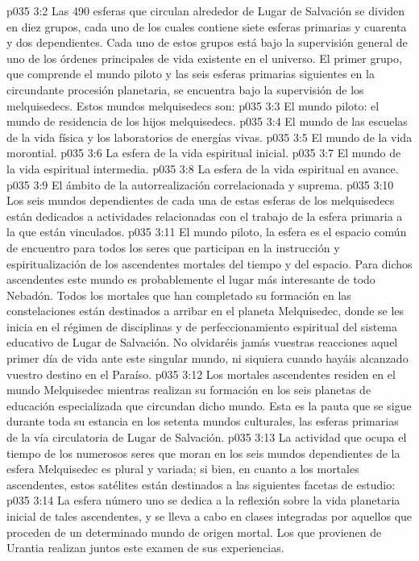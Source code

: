 \vs p035 3:2 Las 490 esferas que circulan alrededor de Lugar de Salvación se dividen en diez grupos, cada uno de los cuales contiene siete esferas primarias y cuarenta y dos dependientes. Cada uno de estos grupos está bajo la supervisión general de uno de los órdenes principales de vida existente en el universo. El primer grupo, que comprende el mundo piloto y las seis esferas primarias siguientes en la circundante procesión planetaria, se encuentra bajo la supervisión de los melquisedecs. Estos mundos melquisedecs son:
\vs p035 3:3 El mundo piloto: el mundo de residencia de los hijos melquisedecs.
\vs p035 3:4 El mundo de las escuelas de la vida física y los laboratorios de energías vivas.
\vs p035 3:5 El mundo de la vida morontial.
\vs p035 3:6 La esfera de la vida espiritual inicial.
\vs p035 3:7 El mundo de la vida espiritual intermedia.
\vs p035 3:8 La esfera de la vida espiritual en avance.
\vs p035 3:9 El ámbito de la autorrealización correlacionada y suprema.
\vs p035 3:10 \pc Los seis mundos dependientes de cada una de estas esferas de los melquisedecs están dedicados a actividades relacionadas con el trabajo de la esfera primaria a la que están vinculados.
\vs p035 3:11 \pc El mundo piloto, la esfera  es el espacio común de encuentro para todos los seres que participan en la instrucción y espiritualización de los ascendentes mortales del tiempo y del espacio. Para dichos ascendentes este mundo es probablemente el lugar más interesante de todo Nebadón. Todos los mortales que han completado su formación en las constelaciones están destinados a arribar en el planeta Melquisedec, donde se les inicia en el régimen de disciplinas y de perfeccionamiento espiritual del sistema educativo de Lugar de Salvación. No olvidaréis jamás vuestras reacciones aquel primer día de vida ante este singular mundo, ni siquiera cuando hayáis alcanzado vuestro destino en el Paraíso.
\vs p035 3:12 Los mortales ascendentes residen en el mundo Melquisedec mientras realizan su formación en los seis planetas de educación especializada que circundan dicho mundo. Esta es la pauta que se sigue durante toda su estancia en los setenta mundos culturales, las esferas primarias de la vía circulatoria de Lugar de Salvación.
\vs p035 3:13 \pc La actividad que ocupa el tiempo de los numerosos seres que moran en los seis mundos dependientes de la esfera Melquisedec es plural y variada; si bien, en cuanto a los mortales ascendentes, estos satélites están destinados a las siguientes facetas de estudio:
\vs p035 3:14 La esfera número uno se dedica a la reflexión sobre la vida planetaria inicial de tales ascendentes, y se lleva a cabo en clases integradas por aquellos que proceden de un determinado mundo de origen mortal. Los que provienen de Urantia realizan juntos este examen de sus experiencias.
